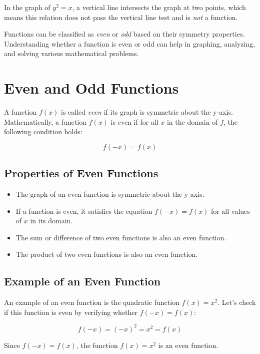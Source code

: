In the graph of \( y^2 = x \), a vertical line intersects the graph at two points, which means this relation does not pass the vertical line test and is \textit{not} a function.

Functions can be classified as \textit{even} or \textit{odd} based on their symmetry properties. Understanding whether a function is even or odd can help in graphing, analyzing, and solving various mathematical problems. 

\section{Even and Odd Functions}

\begin{definition}

A function \( f(x) \) is called \textit{even} if its graph is symmetric about the y-axis. Mathematically, a function \( f(x) \) is even if for all \( x \) in the domain of \( f \), the following condition holds:

\[
f(-x) = f(x)
\]
\end{definition}

\subsection{Properties of Even Functions}
\begin{itemize}
    \item The graph of an even function is symmetric about the y-axis.
    \item If a function is even, it satisfies the equation \( f(-x) = f(x) \) for all values of \( x \) in its domain.
    \item The sum or difference of two even functions is also an even function.
    \item The product of two even functions is also an even function.
\end{itemize}

\subsection*{Example of an Even Function}

An example of an even function is the quadratic function \( f(x) = x^2 \). Let’s check if this function is even by verifying whether \( f(-x) = f(x) \):

\[
f(-x) = (-x)^2 = x^2 = f(x)
\]

Since \( f(-x) = f(x) \), the function \( f(x) = x^2 \) is an even function.

